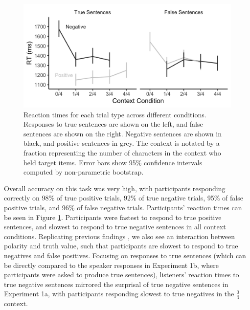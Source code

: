 \documentclass[man, floatsintext, noapacite]{apa6}
\begin{document}
\begin{figure}[t]
\begin{center} 
\includegraphics[width=6in]{figures/experiment1/listener_rts.png}
\caption{\label{fig:exp1_listenerrt} Reaction times for each trial type across different conditions. Responses to true sentences are shown on the left, and false sentences are shown on the right.  Negative sentences are shown in black, and positive sentences in grey.  The context is notated by a fraction representing the number of characters in the context who held target items. Error bars show 95\% confidence intervals computed by non-parametric bootstrap.}
\end{center} 
\end{figure}

Overall accuracy on this task was very high, with participants responding correctly on 98\% of true positive trials, 92\% of true negative trials, 95\% of false positive trials, and 96\% of false negative trials.  Participants' reaction times can be seen in Figure \ref{fig:exp1_listenerrt}. Participants were fastest to respond to true positive sentences, and slowest to respond to true negative sentences in all context conditions. Replicating previous findings \cite{hclark1972}, we also see an interaction between polarity and truth value, such that participants are slowest to respond to true negatives and false positives. Focusing on responses to true sentences (which can be directly compared to the speaker responses in Experiment 1b, where participants were asked to produce true sentences), listeners' reaction times to true negative sentences mirrored the surprisal of true negative sentences in Experiment 1a, with participants responding slowest to true negatives in the $\frac{0}{4}$ context.
\end{document}
